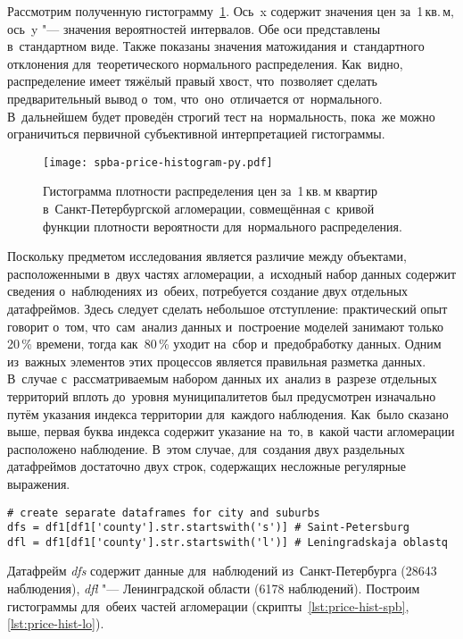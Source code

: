 \documentclass[]{scrreprt}
\begin{document}
Рассмотрим полученную гистограмму~\ref{fig:spba-prices-hist}. Ось~x содержит значения цен за~1\,кв.\,м, ось~y "--- значения вероятностей интервалов. Обе оси представлены в~стандартном виде. Также показаны значения матожидания и~стандартного отклонения для~теоретического нормального распределения. Как~видно, распределение имеет тяжёлый правый хвост, что~позволяет сделать предварительный вывод о~том, что~оно~отличается от~нормального. В~дальнейшем будет проведён строгий тест на~нормальность, пока~же можно ограничиться первичной субъективной интерпретацией гистограммы.
%
\begin{figure}[ht]
	\centering
	\texttt{[image: spba-price-histogram-py.pdf]}
	\caption{Гистограмма плотности распределения цен за~1\,кв.\,м квартир в~Санкт-Петербургской агломерации, совмещённая с~кривой функции плотности вероятности для~нормального распределения.}
	\label{fig:spba-prices-hist}
\end{figure}
%
Поскольку предметом исследования является различие между объектами, расположенными в~двух частях агломерации, а~исходный набор данных содержит сведения о~наблюдениях из~обеих, потребуется создание двух отдельных датафреймов. Здесь следует сделать небольшое отступление: практический опыт говорит о~том, что~сам~анализ данных и~построение моделей занимают только 20\,\% времени, тогда как~80\,\% уходит на~сбор и~предобработку данных. Одним из~важных элементов этих процессов является правильная разметка данных. В~случае с~рассматриваемым набором данных их~анализ в~разрезе отдельных территорий вплоть до~уровня муниципалитетов был предусмотрен изначально путём указания индекса территории для~каждого наблюдения. Как~было сказано выше, первая буква индекса содержит указание на~то, в~какой части агломерации расположено наблюдение. В~этом случае, для~создания двух раздельных датафреймов достаточно двух строк, содержащих несложные регулярные выражения.
%
\begin{lstlisting}[float, caption = Создание отдельных датафреймов для~Санкт-Петербурга и~Ленинградской области, firstnumber=1, label= lst:create-two-separate-df-for-S-Pb-LO]
# create separate dataframes for city and suburbs
dfs = df1[df1['county'].str.startswith('s')] # Saint-Petersburg
dfl = df1[df1['county'].str.startswith('l')] # Leningradskaja oblastq
\end{lstlisting}
%
Датафрейм \emph{dfs} содержит данные для~наблюдений из~Санкт-Петербурга (28643 наблюдения), \emph{dfl} "--- Ленинградской области (6178 наблюдений). Построим гистограммы для~обеих частей агломерации (скрипты~\ref{lst:price-hist-spb}, \ref{lst:price-hist-lo}).
\end{document}

